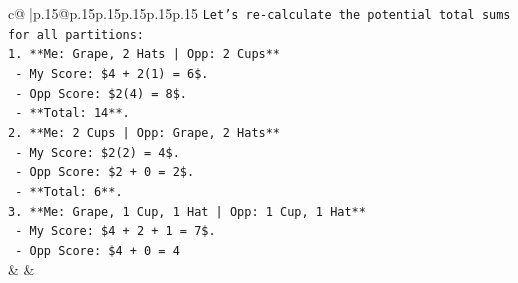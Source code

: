\documentclass{article}
\begin{document}
{\begin{supertabular}{c@{$\;$}|p{.15\linewidth}@{}p{.15\linewidth}p{.15\linewidth}p{.15\linewidth}p{.15\linewidth}p{.15\linewidth}}
{{{\texttt{Let's re{-}calculate the potential total sums for all partitions:} \\
\texttt{1. **Me: Grape, 2 Hats | Opp: 2 Cups**} \\
\texttt{   {-} My Score: \$4 + 2(1) = 6\$.} \\
\texttt{   {-} Opp Score: \$2(4) = 8\$.} \\
\texttt{   {-} **Total: 14**.} \\
\texttt{2. **Me: 2 Cups | Opp: Grape, 2 Hats**} \\
\texttt{   {-} My Score: \$2(2) = 4\$.} \\
\texttt{   {-} Opp Score: \$2 + 0 = 2\$.} \\
\texttt{   {-} **Total: 6**.} \\
\texttt{3. **Me: Grape, 1 Cup, 1 Hat | Opp: 1 Cup, 1 Hat**} \\
\texttt{   {-} My Score: \$4 + 2 + 1 = 7\$.} \\
\texttt{   {-} Opp Score: \$4 + 0 = 4} \\
            }
        }
    }
    & & \\ \\


\end{supertabular}}
\end{document}
